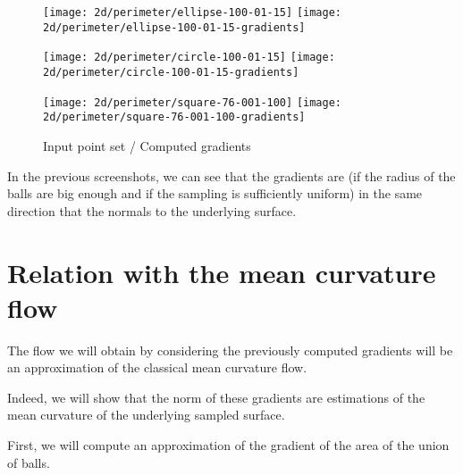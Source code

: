 \begin{figure}[H]
    \centering

    \begin{minipage}{0.8\linewidth}
        \centering
        \texttt{[image: 2d/perimeter/ellipse-100-01-15]}
        \texttt{[image: 2d/perimeter/ellipse-100-01-15-gradients]}
        \label{fig:gradients_perimeter_2d_ellipse}
    \end{minipage}

    \begin{minipage}{0.8\linewidth}
        \centering
        \texttt{[image: 2d/perimeter/circle-100-01-15]}
        \texttt{[image: 2d/perimeter/circle-100-01-15-gradients]}
        \label{fig:gradients_perimeter_2d_circle}
    \end{minipage}

    \begin{minipage}{0.8\linewidth}
        \centering
        \texttt{[image: 2d/perimeter/square-76-001-100]}
        \texttt{[image: 2d/perimeter/square-76-001-100-gradients]}
        \label{fig:gradients_perimeter_2d_square}
    \end{minipage}

    \caption{Input point set / Computed gradients}
    \label{fig:gradients_perimeter_2d}
\end{figure}

In the previous screenshots, we can see that the gradients are (if the radius of
the balls are big enough and if the sampling is sufficiently uniform) in the
same direction that the normals to the underlying surface.


\section{Relation with the mean curvature flow}

The flow we will obtain by considering the previously computed gradients will be
an approximation of the classical mean curvature flow.

Indeed, we will show that the norm of these gradients are estimations of the
mean curvature of the underlying sampled surface.

First, we will compute an approximation of the gradient of the area of the union
of balls.

